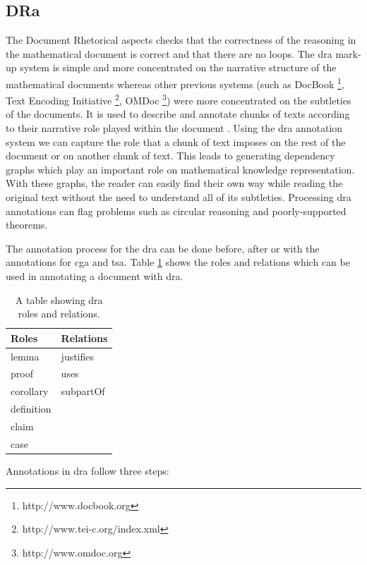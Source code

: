 \subsection{DRa}
\label{subsec:dra}

The Document Rhetorical aspects checks that the correctness of the reasoning in the mathematical document is correct and that there are no loops. The \gls{dra} mark-up system is simple and more concentrated on the narrative structure of the mathematical documents whereas other previous systems (such as DocBook \footnote{http://www.docbook.org}, Text Encoding Initiative \footnote{http://www.tei-c.org/index.xml}, OMDoc \footnote{http://www.omdoc.org}) were more concentrated on  the subtleties of the documents. It is used to describe and annotate chunks of texts according to their narrative role played within the document \cite{krzysztofphd}. Using the \gls{dra} annotation system we can capture the role that a chunk of text imposes on the rest of the document or on another chunk of text. This leads to generating dependency graphs which play an important role on mathematical knowledge representation. With these graphs, the reader can easily find their own way while reading the original text without the need to understand all of its subtleties. Processing \gls{dra} annotations can flag problems such as circular reasoning and poorly-supported theorems.

The annotation process for the \gls{dra} can be done before, after or with the annotations for \gls{cga} and \gls{tsa}. Table \ref{tab:drarolesandrelations} shows the roles and relations which can be used in annotating a document with \gls{dra}.

\begin{table}[H]
\centering
\begin{tabular}{|l||l|}
\hline
\textbf{Roles} & \textbf{Relations} \\
\hline
lemma & justifies \\
proof & uses \\
corollary & subpartOf \\
definition &  \\
claim & \\
case & \\
\hline
\end{tabular}
\caption{A table showing \gls{dra} roles and relations. \label{tab:drarolesandrelations}}
\end{table}

Annotations in \gls{dra} follow three steps:

